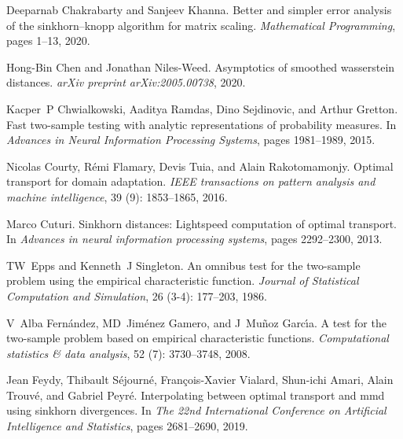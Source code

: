 \documentclass{article}
\theoremstyle{definition}
\begin{document}
\begin{thebibliography}{53}
Deeparnab Chakrabarty and Sanjeev Khanna.
\newblock Better and simpler error analysis of the sinkhorn--knopp algorithm
  for matrix scaling.
\newblock \emph{Mathematical Programming}, pages 1--13, 2020.

Hong-Bin Chen and Jonathan Niles-Weed.
\newblock Asymptotics of smoothed wasserstein distances.
\newblock \emph{arXiv preprint arXiv:2005.00738}, 2020.

Kacper~P Chwialkowski, Aaditya Ramdas, Dino Sejdinovic, and Arthur Gretton.
\newblock Fast two-sample testing with analytic representations of probability
  measures.
\newblock In \emph{Advances in Neural Information Processing Systems}, pages
  1981--1989, 2015.

Nicolas Courty, R{\'e}mi Flamary, Devis Tuia, and Alain Rakotomamonjy.
\newblock Optimal transport for domain adaptation.
\newblock \emph{IEEE transactions on pattern analysis and machine
  intelligence}, 39 (9): 1853--1865, 2016.

Marco Cuturi.
\newblock Sinkhorn distances: Lightspeed computation of optimal transport.
\newblock In \emph{Advances in neural information processing systems}, pages
  2292--2300, 2013.

TW~Epps and Kenneth~J Singleton.
\newblock An omnibus test for the two-sample problem using the empirical
  characteristic function.
\newblock \emph{Journal of Statistical Computation and Simulation}, 26
  (3-4): 177--203, 1986.

V~Alba Fern{\'a}ndez, MD~Jim{\'e}nez Gamero, and J~Mu{\~n}oz Garc{\'\i}a.
\newblock A test for the two-sample problem based on empirical characteristic
  functions.
\newblock \emph{Computational statistics \& data analysis}, 52
  (7): 3730--3748, 2008.

Jean Feydy, Thibault S{\'e}journ{\'e}, Fran{\c{c}}ois-Xavier Vialard, Shun-ichi
  Amari, Alain Trouv{\'e}, and Gabriel Peyr{\'e}.
\newblock Interpolating between optimal transport and mmd using sinkhorn
  divergences.
\newblock In \emph{The 22nd International Conference on Artificial Intelligence
  and Statistics}, pages 2681--2690, 2019.


\end{thebibliography}
\end{document}
